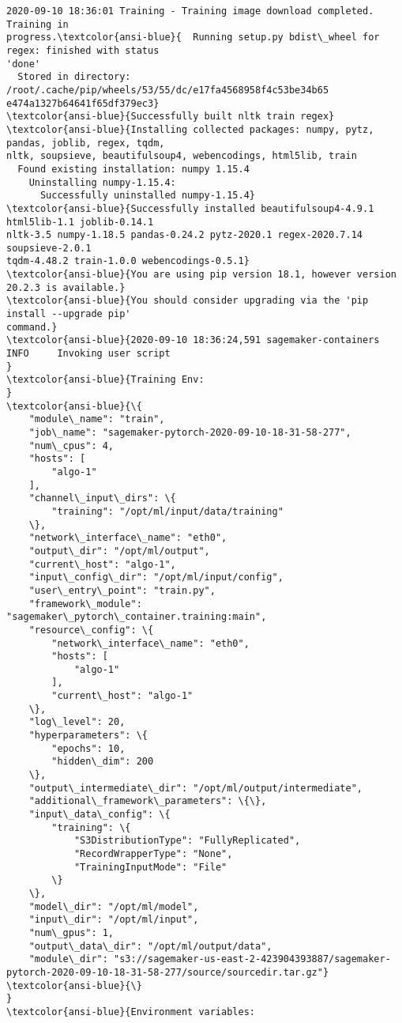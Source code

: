 \documentclass[11pt]{article}
\begin{document}
\begin{Verbatim}[commandchars=\\\{\}]
2020-09-10 18:36:01 Training - Training image download completed. Training in
progress.\textcolor{ansi-blue}{  Running setup.py bdist\_wheel for regex: finished with status
'done'
  Stored in directory: /root/.cache/pip/wheels/53/55/dc/e17fa4568958f4c53be34b65
e474a1327b64641f65df379ec3}
\textcolor{ansi-blue}{Successfully built nltk train regex}
\textcolor{ansi-blue}{Installing collected packages: numpy, pytz, pandas, joblib, regex, tqdm,
nltk, soupsieve, beautifulsoup4, webencodings, html5lib, train
  Found existing installation: numpy 1.15.4
    Uninstalling numpy-1.15.4:
      Successfully uninstalled numpy-1.15.4}
\textcolor{ansi-blue}{Successfully installed beautifulsoup4-4.9.1 html5lib-1.1 joblib-0.14.1
nltk-3.5 numpy-1.18.5 pandas-0.24.2 pytz-2020.1 regex-2020.7.14 soupsieve-2.0.1
tqdm-4.48.2 train-1.0.0 webencodings-0.5.1}
\textcolor{ansi-blue}{You are using pip version 18.1, however version 20.2.3 is available.}
\textcolor{ansi-blue}{You should consider upgrading via the 'pip install --upgrade pip'
command.}
\textcolor{ansi-blue}{2020-09-10 18:36:24,591 sagemaker-containers INFO     Invoking user script
}
\textcolor{ansi-blue}{Training Env:
}
\textcolor{ansi-blue}{\{
    "module\_name": "train",
    "job\_name": "sagemaker-pytorch-2020-09-10-18-31-58-277",
    "num\_cpus": 4,
    "hosts": [
        "algo-1"
    ],
    "channel\_input\_dirs": \{
        "training": "/opt/ml/input/data/training"
    \},
    "network\_interface\_name": "eth0",
    "output\_dir": "/opt/ml/output",
    "current\_host": "algo-1",
    "input\_config\_dir": "/opt/ml/input/config",
    "user\_entry\_point": "train.py",
    "framework\_module": "sagemaker\_pytorch\_container.training:main",
    "resource\_config": \{
        "network\_interface\_name": "eth0",
        "hosts": [
            "algo-1"
        ],
        "current\_host": "algo-1"
    \},
    "log\_level": 20,
    "hyperparameters": \{
        "epochs": 10,
        "hidden\_dim": 200
    \},
    "output\_intermediate\_dir": "/opt/ml/output/intermediate",
    "additional\_framework\_parameters": \{\},
    "input\_data\_config": \{
        "training": \{
            "S3DistributionType": "FullyReplicated",
            "RecordWrapperType": "None",
            "TrainingInputMode": "File"
        \}
    \},
    "model\_dir": "/opt/ml/model",
    "input\_dir": "/opt/ml/input",
    "num\_gpus": 1,
    "output\_data\_dir": "/opt/ml/output/data",
    "module\_dir": "s3://sagemaker-us-east-2-423904393887/sagemaker-
pytorch-2020-09-10-18-31-58-277/source/sourcedir.tar.gz"}
\textcolor{ansi-blue}{\}
}
\textcolor{ansi-blue}{Environment variables:

\end{Verbatim}
\end{document}
